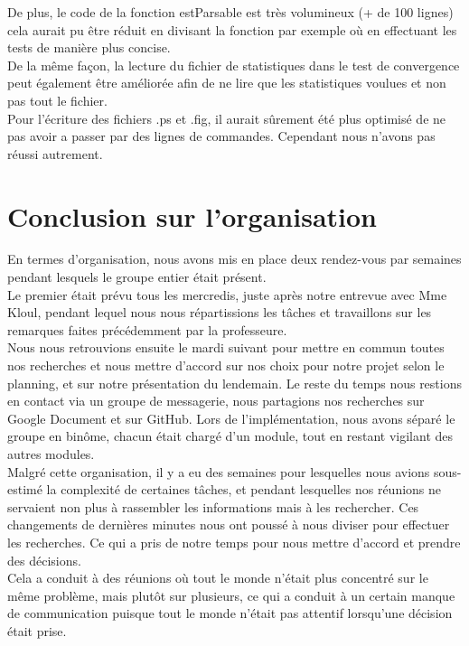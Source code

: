 \documentclass[a4paper,11pt]{article}
\begin{document}
		De plus, le code de la fonction estParsable est très volumineux (+ de 100 lignes) cela aurait pu être réduit en divisant la fonction par exemple où en effectuant les tests de manière plus concise.\\
		De la même façon, la lecture du fichier de statistiques dans le test de convergence peut également être améliorée afin de ne lire que les statistiques voulues et non pas tout le fichier.\\
		Pour l'écriture des fichiers .ps et .fig, il aurait sûrement été plus optimisé de ne pas avoir a passer par des lignes de commandes. Cependant nous n’avons pas réussi autrement.\\

	\section{Conclusion sur l'organisation}
		En termes d’organisation, nous avons mis en place deux rendez-vous par semaines pendant lesquels le groupe entier était présent.\\
		Le premier était prévu tous les mercredis, juste après notre entrevue avec Mme Kloul, pendant lequel nous nous répartissions les tâches et travaillons sur les remarques faites précédemment par la professeure.\\
		Nous nous retrouvions ensuite le mardi suivant pour mettre en commun toutes nos recherches et nous mettre d’accord sur nos choix pour notre projet selon le planning, et sur notre présentation du lendemain. Le reste du temps nous restions en contact via un groupe de messagerie, nous partagions nos recherches sur Google Document et sur GitHub. Lors de l’implémentation, nous avons séparé le groupe en binôme, chacun était chargé d’un module, tout en restant vigilant des autres modules.\\
		Malgré cette organisation, il y a eu des semaines pour lesquelles nous avions sous-estimé la complexité de certaines tâches, et pendant lesquelles nos réunions ne servaient non plus à rassembler les informations mais à les rechercher. Ces changements de dernières minutes nous ont poussé à nous diviser pour effectuer les recherches. Ce qui a pris de notre temps pour nous mettre d’accord et prendre des décisions.\\
		Cela a conduit à des réunions où tout le monde n’était plus concentré sur le même problème, mais plutôt sur plusieurs, ce qui a conduit à un certain manque de communication puisque tout le monde n’était pas attentif lorsqu’une décision était prise.\\
\end{document}
